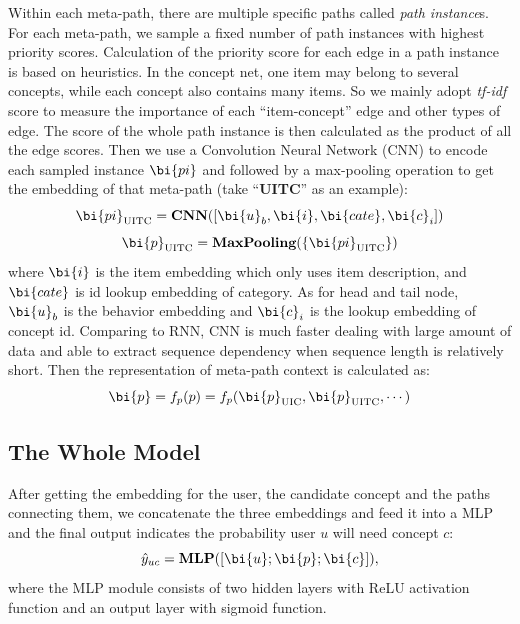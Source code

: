 Within each meta-path, 
there are multiple specific paths called \textit{path instance}s.
For each meta-path, we sample a fixed number of path instances with highest priority scores.
Calculation of the priority score for each edge in a path instance is based on heuristics.
In the concept net, one item may belong to several concepts, while each concept also contains many items. So we mainly adopt \textit{tf-idf} score to measure the importance of each ``item-concept'' edge and other types of edge.
The score of the whole path instance is then calculated as the product of all the edge scores.
Then we use a Convolution Neural Network (CNN) to encode each sampled instance $\bi{pi}$ and followed by a max-pooling operation to get the embedding of that meta-path
(take ``\textbf{UITC}'' as an example):
\begin{equation}
\label{eqn:cnn}
\bi{pi}_{\text{UITC}} =  \textbf{CNN}([\bi{u}_b, \bi{i}, \bi{cate}, \bi{c}_i])
\end{equation}
\begin{equation}
\bi{p}_{\text{UITC}} = \textbf{MaxPooling}(\{\bi{pi}_{\text{UITC}}\})
\end{equation}
where $\bi{i}$ is the item embedding which only uses item description, 
and $\bi{cate}$ is id lookup embedding of category. As for head and tail node, $\bi{u}_b$ is the behavior embedding and $\bi{c}_i$ is the lookup embedding of concept id.
Comparing to RNN, CNN is much faster dealing with large amount of data and able to extract sequence dependency when sequence length is relatively short.
Then the representation of meta-path context is calculated as:
\begin{equation}
\label{eqn:fp}
\bi{p} = f_p(p) = f_p(\bi{p}_{\text{UIC}}, \bi{p}_{\text{UITC}}, \cdots)
\end{equation}


\subsection{The Whole Model}

After getting the embedding for the user, the candidate concept and the paths connecting them, we concatenate the three embeddings and feed it into a MLP and the final output indicates the probability user $u$ will need concept $c$:
\begin{equation}
\hat y_{uc} = \textbf{MLP}([\bi{u};\bi{p};\bi{c}]),
\end{equation}
where the MLP module consists of two hidden layers with ReLU activation function and an output layer with sigmoid function.

